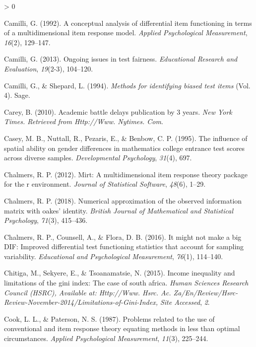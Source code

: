 \documentclass[
  english,
  man,floatsintext]{apa6}
\newlength{\cslhangindent}
\newenvironment{CSLReferences}[2] %
 {%
  \setlength{\parindent}{0pt}
  \ifodd #1 \everypar{\setlength{\hangindent}{\cslhangindent}}\ignorespaces\fi
  \ifnum #2 > 0
  \setlength{\parskip}{#2\baselineskip}
  \fi
 }%
 {}
\begin{document}
\begin{CSLReferences}{1}{0}
\leavevmode\hypertarget{ref-camilli1992conceptual}{}%
Camilli, G. (1992). A conceptual analysis of differential item functioning in terms of a multidimensional item response model. \emph{Applied Psychological Measurement}, \emph{16}(2), 129--147.

\leavevmode\hypertarget{ref-camilli2013ongoing}{}%
Camilli, G. (2013). Ongoing issues in test fairness. \emph{Educational Research and Evaluation}, \emph{19}(2-3), 104--120.

\leavevmode\hypertarget{ref-camilli1994methods}{}%
Camilli, G., \& Shepard, L. (1994). \emph{Methods for identifying biased test items} (Vol. 4). Sage.

\leavevmode\hypertarget{ref-carey2010academic}{}%
Carey, B. (2010). Academic battle delays publication by 3 years. \emph{New York Times. Retrieved from Http://Www. Nytimes. Com}.

\leavevmode\hypertarget{ref-casey1995influence}{}%
Casey, M. B., Nuttall, R., Pezaris, E., \& Benbow, C. P. (1995). The influence of spatial ability on gender differences in mathematics college entrance test scores across diverse samples. \emph{Developmental Psychology}, \emph{31}(4), 697.

\leavevmode\hypertarget{ref-chalmers2012mirt}{}%
Chalmers, R. P. (2012). Mirt: A multidimensional item response theory package for the r environment. \emph{Journal of Statistical Software}, \emph{48}(6), 1--29.

\leavevmode\hypertarget{ref-chalmers2018numerical}{}%
Chalmers, R. P. (2018). Numerical approximation of the observed information matrix with oakes' identity. \emph{British Journal of Mathematical and Statistical Psychology}, \emph{71}(3), 415--436.

\leavevmode\hypertarget{ref-chalmers2016might}{}%
Chalmers, R. P., Counsell, A., \& Flora, D. B. (2016). It might not make a big DIF: Improved differential test functioning statistics that account for sampling variability. \emph{Educational and Psychological Measurement}, \emph{76}(1), 114--140.

\leavevmode\hypertarget{ref-chitiga2015income}{}%
Chitiga, M., Sekyere, E., \& Tsoanamatsie, N. (2015). Income inequality and limitations of the gini index: The case of south africa. \emph{Human Sciences Research Council (HSRC), Available at: Http://Www. Hsrc. Ac. Za/En/Review/Hsrc-Review-November-2014/Limitations-of-Gini-Index, Site Accessed}, \emph{2}.

\leavevmode\hypertarget{ref-cook1987problems}{}%
Cook, L. L., \& Paterson, N. S. (1987). Problems related to the use of conventional and item response theory equating methods in less than optimal circumstances. \emph{Applied Psychological Measurement}, \emph{11}(3), 225--244.


\end{CSLReferences}
\end{document}
